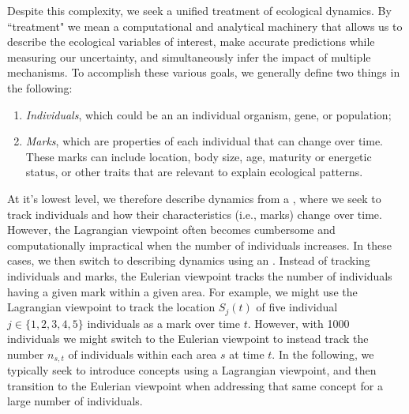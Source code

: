Despite this complexity, we seek a unified treatment of ecological dynamics.  By ``treatment" we mean a computational and analytical machinery that allows us to describe the ecological variables of interest, make accurate predictions while measuring our uncertainty, and simultaneously infer the impact of multiple mechanisms.  To accomplish these various goals, we generally define two things in the following:
\begin{enumerate}
    \item \textit{Individuals}, which could be an an individual organism, gene, or population;
    
    \item \textit{Marks}, which are properties of each individual that can change over time. These marks can include location, body size, age, maturity or energetic status, or other traits that are relevant to explain ecological patterns.
\end{enumerate}
At it's lowest level, we therefore describe dynamics from a , where we seek to track individuals and how their characteristics (i.e., marks) change over time.  However, the Lagrangian viewpoint often becomes cumbersome and computationally impractical when the number of individuals increases.  In these cases, we then switch to describing dynamics using an . Instead of tracking individuals and marks, the Eulerian viewpoint tracks the number of individuals having a given mark within a given area.  For example, we might use the Lagrangian viewpoint to track the location \( S_j(t) \) of five individual \(j \in \{1,2,3,4,5\} \) individuals as a mark over time \( t \).  However, with 1000 individuals we might switch to the Eulerian viewpoint to instead track the number \( n_{s,t} \) of individuals within each area \(s\) at time \(t\).  In the following, we typically seek to introduce concepts using a Lagrangian viewpoint, and then transition to the Eulerian viewpoint when addressing that same concept for a large number of individuals.  

